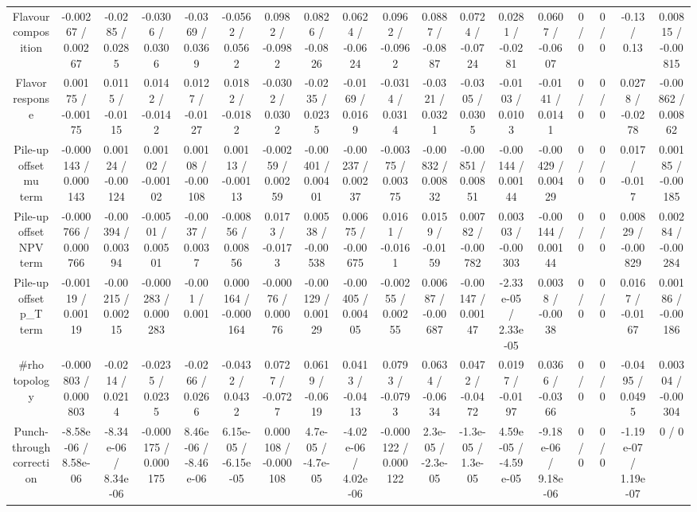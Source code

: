 \documentclass[10pt]{article}
\begin{document}
\begin{table}[htbp]
\begin{center}
\begin{tabular}{|c|c|c|c|c|c|c|c|c|c|c|c|c|c|c|c|c|c|}
  Flavour composition & -0.00267 / 0.00267 & -0.0285 / 0.0285 & -0.0306 / 0.0306 & -0.0369 / 0.0369 & -0.0562 / 0.0562 & 0.0982 / -0.0982 & 0.0826 / -0.0826 & 0.0624 / -0.0624 & 0.0962 / -0.0962 & 0.0887 / -0.0887 & 0.0724 / -0.0724 & 0.0281 / -0.0281 & 0.0607 / -0.0607 & 0 / 0 & 0 / 0 & -0.13 / 0.13 & 0.00815 / -0.00815 \\ 
  Flavor response & 0.00175 / -0.00175 & 0.0115 / -0.0115 & 0.0142 / -0.0142 & 0.0127 / -0.0127 & 0.0182 / -0.0182 & -0.0302 / 0.0302 & -0.0235 / 0.0235 & -0.0169 / 0.0169 & -0.0314 / 0.0314 & -0.0321 / 0.0321 & -0.0305 / 0.0305 & -0.0103 / 0.0103 & -0.0141 / 0.0141 & 0 / 0 & 0 / 0 & 0.0278 / -0.0278 & -0.00862 / 0.00862 \\ 
  Pile-up offset mu term & -0.000143 / 0.000143 & 0.00124 / -0.00124 & 0.00102 / -0.00102 & 0.00108 / -0.00108 & 0.00113 / -0.00113 & -0.00259 / 0.00259 & -0.00401 / 0.00401 & -0.00237 / 0.00237 & -0.00375 / 0.00375 & -0.00832 / 0.00832 & -0.00851 / 0.00851 & -0.00144 / 0.00144 & -0.00429 / 0.00429 & 0 / 0 & 0 / 0 & 0.017 / -0.017 & 0.00185 / -0.00185 \\ 
  Pile-up offset NPV term & -0.000766 / 0.000766 & -0.00394 / 0.00394 & -0.00501 / 0.00501 & -0.0037 / 0.0037 & -0.00856 / 0.00856 & 0.0173 / -0.0173 & 0.00538 / -0.00538 & 0.00675 / -0.00675 & 0.0161 / -0.0161 & 0.0159 / -0.0159 & 0.00782 / -0.00782 & 0.00303 / -0.00303 & -0.00144 / 0.00144 & 0 / 0 & 0 / 0 & 0.00829 / -0.00829 & 0.00284 / -0.00284 \\ 
  Pile-up offset p_{T} term & -0.00119 / 0.00119 & -0.00215 / 0.00215 & -0.000283 / 0.000283 & -0.001 / 0.001 & 0.000164 / -0.000164 & -0.00076 / 0.00076 & -0.00129 / 0.00129 & -0.00405 / 0.00405 & -0.00255 / 0.00255 & 0.00687 / -0.00687 & -0.00147 / 0.00147 & -2.33e-05 / 2.33e-05 & 0.0038 / -0.0038 & 0 / 0 & 0 / 0 & 0.0167 / -0.0167 & 0.00186 / -0.00186 \\ 
  #rho topology & -0.000803 / 0.000803 & -0.0214 / 0.0214 & -0.0235 / 0.0235 & -0.0266 / 0.0266 & -0.0432 / 0.0432 & 0.0727 / -0.0727 & 0.0619 / -0.0619 & 0.0413 / -0.0413 & 0.0793 / -0.0793 & 0.0634 / -0.0634 & 0.0472 / -0.0472 & 0.0197 / -0.0197 & 0.0366 / -0.0366 & 0 / 0 & 0 / 0 & -0.0495 / 0.0495 & 0.00304 / -0.00304 \\ 
  Punch-through correction & -8.58e-06 / 8.58e-06 & -8.34e-06 / 8.34e-06 & -0.000175 / 0.000175 & 8.46e-06 / -8.46e-06 & 6.15e-05 / -6.15e-05 & 0.000108 / -0.000108 & 4.7e-05 / -4.7e-05 & -4.02e-06 / 4.02e-06 & -0.000122 / 0.000122 & 2.3e-05 / -2.3e-05 & -1.3e-05 / 1.3e-05 & 4.59e-05 / -4.59e-05 & -9.18e-06 / 9.18e-06 & 0 / 0 & 0 / 0 & -1.19e-07 / 1.19e-07 & 0 / 0 \\ 

\end{tabular}
\end{center}
\end{table}
\end{document}
